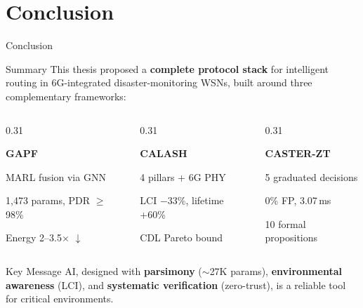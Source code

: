 \documentclass[10pt,aspectratio=169]{beamer}
\begin{document}
\section{Conclusion}

\begin{frame}[shrink=8]{Conclusion}
\begin{block}{Summary}
  This thesis proposed a \textbf{complete protocol stack} for intelligent routing in 6G-integrated disaster-monitoring WSNs, built around three complementary frameworks:
\end{block}

\vspace{4pt}
\begin{columns}[T]
\begin{column}{0.31\textwidth}
  \centering
  {\Large \faLightbulb}\par\vspace{4pt}
  \textbf{GAPF}\par
  {\small MARL fusion via GNN\par
  1,473 params, PDR $\geq$ 98\%\par
  Energy 2--3.5$\times$ $\downarrow$\par}
\end{column}
\begin{column}{0.31\textwidth}
  \centering
  {\Large \faLeaf}\par\vspace{4pt}
  \textbf{CALASH}\par
  {\small 4 pillars + 6G PHY\par
  LCI $-$33\%, lifetime +60\%\par
  CDL Pareto bound\par}
\end{column}
\begin{column}{0.31\textwidth}
  \centering
  {\Large \faLock}\par\vspace{4pt}
  \textbf{CASTER-ZT}\par
  {\small 5 graduated decisions\par
  0\% FP, 3.07\,ms\par
  10 formal propositions\par}
\end{column}
\end{columns}

\vspace{8pt}
\begin{exampleblock}{Key Message}
  \centering
  AI, designed with \textbf{parsimony} ($\sim$27K params), \textbf{environmental awareness} (LCI), and \textbf{systematic verification} (zero-trust), is a reliable tool for critical environments.
\end{exampleblock}
\end{frame}
\end{document}
